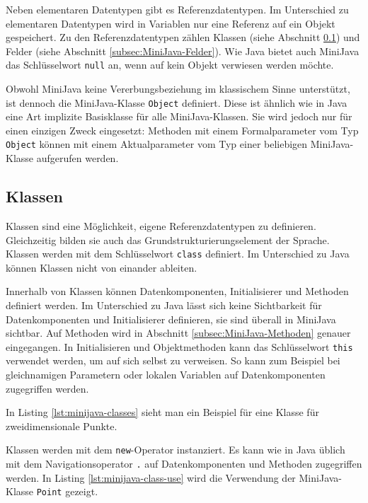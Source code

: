 Neben elementaren Datentypen gibt es Referenzdatentypen. Im Unterschied zu elementaren Datentypen wird in Variablen nur eine Referenz auf ein Objekt gespeichert. Zu den Referenzdatentypen zählen Klassen (siehe Abschnitt \ref{subsec:MiniJava-Klassen}) und Felder (siehe Abschnitt \ref{subsec:MiniJava-Felder}). Wie Java bietet auch MiniJava das Schlüsselwort \lstinline{null} an, wenn auf kein Objekt verwiesen werden möchte.

Obwohl MiniJava keine Vererbungsbeziehung im klassischem Sinne unterstützt, ist dennoch die MiniJava-Klasse \lstinline{Object} definiert. Diese ist ähnlich wie in Java eine Art implizite Basisklasse für alle MiniJava-Klassen. Sie wird jedoch nur für einen einzigen Zweck eingesetzt: Methoden mit einem Formalparameter vom Typ \lstinline{Object} können mit einem Aktualparameter vom Typ einer beliebigen MiniJava-Klasse aufgerufen werden.

\subsection{Klassen}
\label{subsec:MiniJava-Klassen}

Klassen sind eine Möglichkeit, eigene Referenzdatentypen zu definieren. Gleichzeitig bilden sie auch das Grundstrukturierungselement der Sprache. Klassen werden mit dem Schlüsselwort \lstinline{class} definiert. Im Unterschied zu Java können Klassen nicht von einander ableiten.

Innerhalb von Klassen können Datenkomponenten, Initialisierer und Methoden definiert werden. Im Unterschied zu Java lässt sich keine Sichtbarkeit für Datenkomponenten und Initialisierer definieren, sie sind überall in MiniJava sichtbar. Auf Methoden wird in Abschnitt \ref{subsec:MiniJava-Methoden} genauer eingegangen. In Initialisieren und Objektmethoden kann das Schlüsselwort \lstinline{this} verwendet werden, um auf sich selbst zu verweisen. So kann zum Beispiel bei gleichnamigen Parametern oder lokalen Variablen auf Datenkomponenten zugegriffen werden.

In Listing \ref{lst:minijava-classes} sieht man ein Beispiel für eine Klasse für zweidimensionale Punkte.



Klassen werden mit dem \lstinline{new}-Operator instanziert. Es kann wie in Java üblich mit dem Navigationsoperator \lstinline{.} auf Datenkomponenten und Methoden zugegriffen werden. In Listing \ref{lst:minijava-class-use} wird die Verwendung der MiniJava-Klasse \lstinline{Point} gezeigt.

